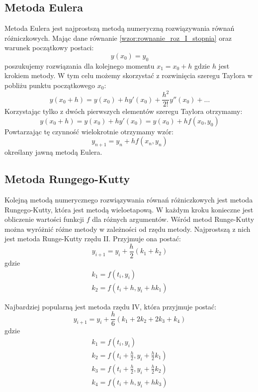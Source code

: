 \subsection*{Metoda Eulera}
Metoda Eulera jest najprostszą metodą numeryczną rozwiązywania równań różniczkowych. Mając dane równanie \ref{wzor:rownanie_roz_I_stopnia} oraz warunek początkowy postaci:
\begin{equation}
	y(x_0) = y_0	
\end{equation}
poszukujemy rozwiązania dla kolejnego momentu $x_1 = x_0 + h$ gdzie $h$ jest krokiem metody. W tym celu możemy skorzystać z rozwinięcia szeregu Taylora w pobliżu punktu początkowego $x_0$:
\begin{equation}
	y(x_0 + h) = y(x_0) + hy'(x_0) + \frac{h^2}{2!}y''(x_0) + \hdots
\end{equation}
Korzystając tylko z dwóch pierwszych elementów szeregu Taylora otrzymamy:
\begin{equation}
	y(x_0 + h) = y(x_0) + hy'(x_0) = y(x_0) + hf(x_0,y_0)
\end{equation}
Powtarzając tę czynność wielokrotnie otrzymamy wzór:
\begin{equation}
	y_{n+1} = y_{n} + hf(x_n,y_n)
\end{equation}
określany jawną metodą Eulera.

\subsection*{Metoda Rungego-Kutty}
Kolejną metodą numerycznego rozwiązywania równań różniczkowych jest metoda Rungego-Kutty, która jest metodą wieloetapową. W każdym kroku konieczne jest obliczenie wartości funkcji $f$ dla różnych argumentów. Wśród metod Runge-Kutty można wyróżnić różne metody w zależności od rzędu metody. Najprostszą z nich jest metoda Runge-Kutty rzędu II. Przyjmuje ona postać:
\begin{equation}
	y_{i+1} = y_i + \frac{h}{2}(k_1 + k_2)
\end{equation}
gdzie
$$\begin{array}{c}
	k_1 = f(t_i,y_i) \\
	k_2 = f(t_i + h, y_i + hk_1)
\end{array}$$

Najbardziej popularną jest metoda rzędu IV, która przyjmuje postać:
\begin{equation}
	y_{i+1} = y_i + \frac{h}{6}(k_1 + 2k_2 + 2k_3 + k_4)
\end{equation}
gdzie
$$\begin{array}{c}
	k_1 = f(t_i,y_i) \\
	k_2 = f(t_i + \frac{h}{2}, y_i + \frac{h}{2}k_1) \\
	k_3 = f(t_i + \frac{h}{2}, y_i + \frac{h}{2}k_2) \\
	k_4 = f(t_i + h,y_i + hk_3) \\
\end{array}$$

